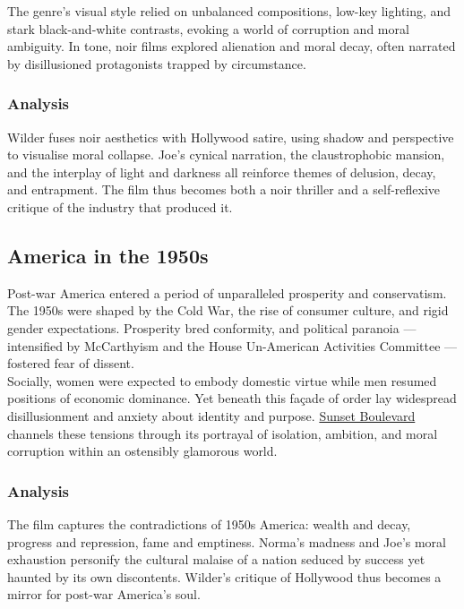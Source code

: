 \documentclass[a4paper]{article}
\begin{document}
The genre’s visual style relied on unbalanced compositions, low-key lighting, and stark black-and-white contrasts, evoking a world of corruption and moral ambiguity. In tone, noir films explored alienation and moral decay, often narrated by disillusioned protagonists trapped by circumstance.\\

\subsubsection{Analysis}
Wilder fuses noir aesthetics with Hollywood satire, using shadow and perspective to visualise moral collapse. Joe’s cynical narration, the claustrophobic mansion, and the interplay of light and darkness all reinforce themes of delusion, decay, and entrapment. The film thus becomes both a noir thriller and a self-reflexive critique of the industry that produced it.\\

\subsection{America in the 1950s}
Post-war America entered a period of unparalleled prosperity and conservatism. The 1950s were shaped by the Cold War, the rise of consumer culture, and rigid gender expectations. Prosperity bred conformity, and political paranoia — intensified by McCarthyism and the House Un-American Activities Committee — fostered fear of dissent.\\

Socially, women were expected to embody domestic virtue while men resumed positions of economic dominance. Yet beneath this façade of order lay widespread disillusionment and anxiety about identity and purpose. \underline{Sunset Boulevard} channels these tensions through its portrayal of isolation, ambition, and moral corruption within an ostensibly glamorous world.\\

\subsubsection{Analysis}
The film captures the contradictions of 1950s America: wealth and decay, progress and repression, fame and emptiness. Norma’s madness and Joe’s moral exhaustion personify the cultural malaise of a nation seduced by success yet haunted by its own discontents. Wilder’s critique of Hollywood thus becomes a mirror for post-war America’s soul.\\
\newpage
\end{document}
